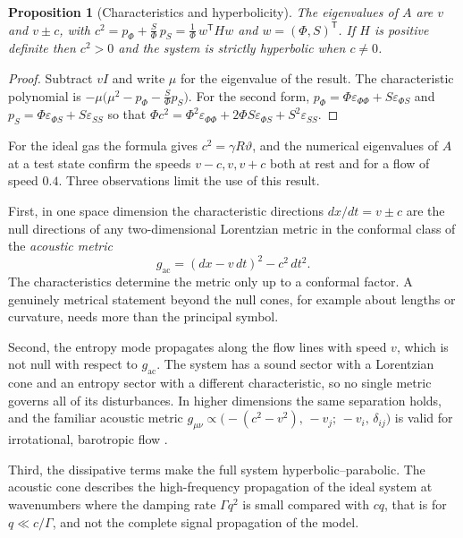 \documentclass[11pt,oneside]{book}
\newtheorem{proposition}[theorem]{Proposition}
\theoremstyle{definition}
\theoremstyle{remark}
\begin{document}
\begin{proposition}[Characteristics and hyperbolicity]\label{prop:char}
The eigenvalues of $A$ are $v$ and $v\pm c$, with $c^2=p_\Phi+\tfrac S\Phi\,p_S=\tfrac1\Phi\,w^{\mathsf T}Hw$ and $w=(\Phi,S)^{\mathsf T}$. If $H$ is positive definite then $c^2>0$ and the system is strictly hyperbolic when $c\neq0$.
\end{proposition}

\begin{proof}
Subtract $vI$ and write $\mu$ for the eigenvalue of the result. The characteristic polynomial is $-\mu\bigl(\mu^2-p_\Phi-\tfrac S\Phi p_S\bigr)$. For the second form, $p_\Phi=\Phi\varepsilon_{\Phi\Phi}+S\varepsilon_{\Phi S}$ and $p_S=\Phi\varepsilon_{\Phi S}+S\varepsilon_{SS}$ so that $\Phi c^2=\Phi^2\varepsilon_{\Phi\Phi}+2\Phi S\varepsilon_{\Phi S}+S^2\varepsilon_{SS}$.
\end{proof}

For the ideal gas the formula gives $c^2=\gamma R\vartheta$, and the numerical eigenvalues of $A$ at a test state confirm the speeds $v-c,v,v+c$ both at rest and for a flow of speed $0.4$. Three observations limit the use of this result.

First, in one space dimension the characteristic directions $dx/dt=v\pm c$ are the null directions of any two-dimensional Lorentzian metric in the conformal class of the \emph{acoustic metric}
\[
g_{\mathrm{ac}}=(dx-v\,dt)^2-c^2\,dt^2 .
\]
The characteristics determine the metric only up to a conformal factor. A genuinely metrical statement beyond the null cones, for example about lengths or curvature, needs more than the principal symbol.

Second, the entropy mode propagates along the flow lines with speed $v$, which is not null with respect to $g_{\mathrm{ac}}$. The system has a sound sector with a Lorentzian cone and an entropy sector with a different characteristic, so no single metric governs all of its disturbances. In higher dimensions the same separation holds, and the familiar acoustic metric $g_{\mu\nu}\propto\bigl(\!-(c^2-v^2),\,-v_j;\,-v_i,\,\delta_{ij}\bigr)$ is valid for irrotational, barotropic flow \cite{unruh1981,visser1998}.

Third, the dissipative terms make the full system hyperbolic--parabolic. The acoustic cone describes the high-frequency propagation of the ideal system at wavenumbers where the damping rate $\Gamma q^2$ is small compared with $cq$, that is for $q\ll c/\Gamma$, and not the complete signal propagation of the model.
\end{document}
